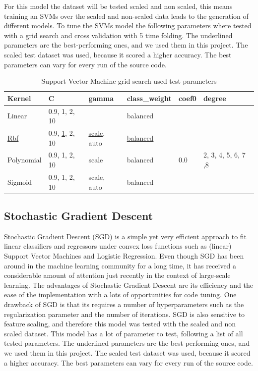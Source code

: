 \documentclass[11pt]{article}
\renewcommand{\arraystretch}{1.3}
\begin{document}
	For this model the dataset will be tested scaled and non scaled, this means training an SVMs over the scaled and non-scaled data leads to the generation of different models. To tune the SVMs model the following parameters where tested with a grid search and cross validation with 5 time folding. The underlined parameters are the best-performing ones, and we used them in this project. The scaled test dataset was used, because it scored a higher accuracy. The best parameters can vary for every run of the source code.
	\begin{table}[H]
		\renewcommand{\arraystretch}{1.3}
		\centering
		\begin{tabular}{llllll}
			Kernel & C  & gamma & class\_weight & coef0 & degree \\
			\toprule
			Linear & 0.9, 1, 2, 10  & & balanced & & \\
			\underline{Rbf} &  0.9, \underline{1}, 2, 10  & \underline{scale}, auto & \underline{balanced} & & \\
			Polynomial & 0.9, 1, 2, 10 & scale & balanced & 0.0 & 2, 3, 4, 5, 6, 7 ,8 \\
			Sigmoid & 0.9, 1, 2, 10  & scale, auto & balanced & & \\
		\end{tabular}
		\caption{Support Vector Machine grid search used test parameters}
		\label{tab:SVMSParameters}
	\end{table}

	\subsection{Stochastic Gradient Descent}
	Stochastic Gradient Descent (SGD) is a simple yet very efficient approach to fit linear classifiers and regressors under convex loss functions such as (linear) Support Vector Machines and Logistic Regression. Even though SGD has been around in the machine learning community for a long time, it has received a considerable amount of attention just recently in the context of large-scale learning.
	\medbreak
	The advantages of Stochastic Gradient Descent are its efficiency and the ease of the implementation with a lots of opportunities for code tuning. One drawback of SGD is that its requires a number of hyperparameters such as the regularization parameter and the number of iterations. SGD is also sensitive to feature scaling, and therefore this model was tested with the scaled and non scaled dataset. This model has a lot of parameter to test, following a list of all tested parameters. The underlined parameters are the best-performing ones, and we used them in this project. The scaled test dataset was used, because it scored a higher accuracy. The best parameters can vary for every run of the source code.
	
\end{document}
